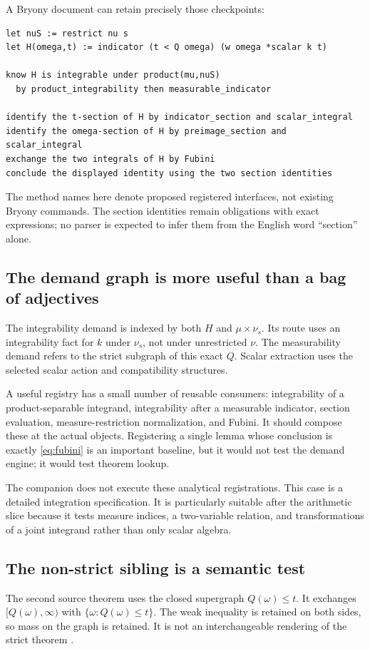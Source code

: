 \documentclass[11pt,a4paper]{article}
\theoremstyle{definition}\newtheorem{definition}[theorem]{Definition}
\theoremstyle{remark}\newtheorem{remark}[theorem]{Remark}
\begin{document}
A Bryony document can retain precisely those checkpoints:
\begin{lstlisting}
let nuS := restrict nu s
let H(omega,t) := indicator (t < Q omega) (w omega *scalar k t)

know H is integrable under product(mu,nuS)
  by product_integrability then measurable_indicator

identify the t-section of H by indicator_section and scalar_integral
identify the omega-section of H by preimage_section and scalar_integral
exchange the two integrals of H by Fubini
conclude the displayed identity using the two section identities
\end{lstlisting}
The method names here denote proposed registered interfaces, not existing Bryony commands. The section identities remain obligations with exact expressions; no parser is expected to infer them from the English word ``section'' alone.

\subsection{The demand graph is more useful than a bag of adjectives}
The integrability demand is indexed by both $H$ and $\mu\times\nu_s$. Its route uses an integrability fact for $k$ under $\nu_s$, not under unrestricted $\nu$. The measurability demand refers to the strict subgraph of this exact $Q$. Scalar extraction uses the selected scalar action and compatibility structures.

A useful registry has a small number of reusable consumers: integrability of a product-separable integrand, integrability after a measurable indicator, section evaluation, measure-restriction normalization, and Fubini. It should compose these at the actual objects. Registering a single lemma whose conclusion is exactly \eqref{eq:fubini} is an important baseline, but it would not test the demand engine; it would test theorem lookup.

The companion does not execute these analytical registrations. This case is a detailed integration specification. It is particularly suitable after the arithmetic slice because it tests measure indices, a two-variable relation, and transformations of a joint integrand rather than only scalar algebra.

\subsection{The non-strict sibling is a semantic test}
The second source theorem uses the closed supergraph $Q(\omega)\le t$. It exchanges $[Q(\omega),\infty)$ with $\{\omega:Q(\omega)\le t\}$. The weak inequality is retained on both sides, so mass on the graph is retained. It is not an interchangeable rendering of the strict theorem \cite{subgraph}.
\end{document}
